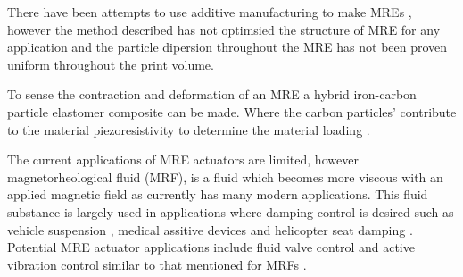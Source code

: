 There have been attempts to use additive manufacturing to make MREs \citep{Krueger2014,Ge2020}, however the method described has not optimsied the structure of MRE for any application and the particle dipersion throughout the MRE has not been proven uniform throughout the print volume. 

To sense the contraction and deformation of an MRE a hybrid iron-carbon particle elastomer composite can be made. Where the carbon particles' contribute to the material piezoresistivity to determine the material loading \cite{Bica2011,Costi2024}. 

The current applications of MRE actuators are limited, however magnetorheological fluid (MRF), is a fluid which becomes more viscous with an applied magnetic field as currently has many modern applications. This fluid substance is largely used in applications where damping control is desired such as vehicle suspension \citep{UnuhH2019}, medical assitive devices \citep{Chen2017} and helicopter seat damping \citep{Hiemenz2007}. Potential MRE actuator applications include fluid valve control \citep{Bose2012} and active vibration control similar to that mentioned for MRFs \citep{UnuhH2019}. 



